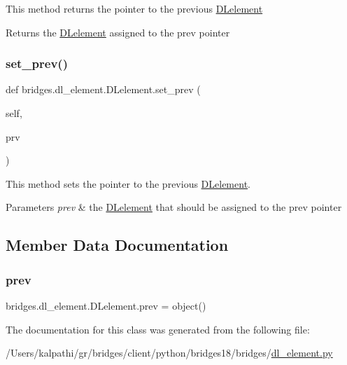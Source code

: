 This method returns the pointer to the previous \mbox{\hyperlink{classbridges_1_1dl__element_1_1_d_lelement}{D\+Lelement}}

\begin{DoxyReturn}{Returns}
the \mbox{\hyperlink{classbridges_1_1dl__element_1_1_d_lelement}{D\+Lelement}} assigned to the prev pointer 
\end{DoxyReturn}
\mbox{\label{classbridges_1_1dl__element_1_1_d_lelement_ad8697b336305478e1a9f6a3850fd2cb2}} 
\subsubsection{\texorpdfstring{set\+\_\+prev()}{set\_prev()}}
{\footnotesize\ttfamily def bridges.\+dl\+\_\+element.\+D\+Lelement.\+set\+\_\+prev (\begin{DoxyParamCaption}\item[{}]{self,  }\item[{}]{prv }\end{DoxyParamCaption})}



This method sets the pointer to the previous \mbox{\hyperlink{classbridges_1_1dl__element_1_1_d_lelement}{D\+Lelement}}. 


\begin{DoxyParams}{Parameters}
{\em prev} & the \mbox{\hyperlink{classbridges_1_1dl__element_1_1_d_lelement}{D\+Lelement}} that should be assigned to the prev pointer \\
\hline
\end{DoxyParams}


\subsection{Member Data Documentation}
\mbox{\label{classbridges_1_1dl__element_1_1_d_lelement_a90ac125877c6733ee7f0181ce19e02df}} 
\subsubsection{\texorpdfstring{prev}{prev}}
{\footnotesize\ttfamily bridges.\+dl\+\_\+element.\+D\+Lelement.\+prev = object()\hspace{0.3cm}{\ttfamily [static]}}



The documentation for this class was generated from the following file\+:\begin{DoxyCompactItemize}
\item 
/\+Users/kalpathi/gr/bridges/client/python/bridges18/bridges/\mbox{\hyperlink{dl__element_8py}{dl\+\_\+element.\+py}}\end{DoxyCompactItemize}
